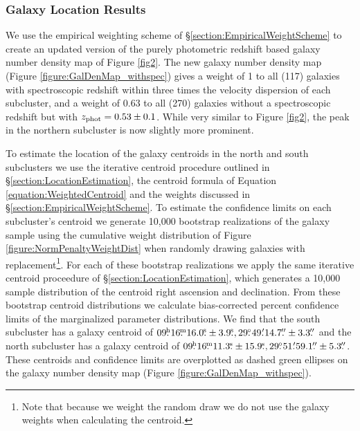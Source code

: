 \subsubsection{Galaxy Location Results}

We use the empirical weighting scheme of \S\ref{section:EmpiricalWeightScheme} to create an updated version of the purely photometric redshift based galaxy number density map of Figure \ref{fig2}.
The new galaxy number density map (Figure \ref{figure:GalDenMap_withspec}) gives a weight of 1 to all (117) galaxies with spectroscopic redshift within three times the velocity dispersion of each subcluster, and a  weight of 0.63 to all (270) galaxies without a spectroscopic redshift but with $z_{\rm phot}=0.53\pm0.1$.
While very similar to Figure \ref{fig2}, the peak in the northern subcluster is now slightly more prominent.

To estimate the location of the galaxy centroids in the north and south subclusters we use the iterative centroid procedure outlined in \S\ref{section:LocationEstimation}, the centroid formula of Equation \ref{equation:WeightedCentroid} and the weights discussed in \S\ref{section:EmpiricalWeightScheme}.
To estimate the confidence limits on each subcluster's centroid we generate 10,000 bootstrap realizations of the galaxy sample using the cumulative weight distribution of Figure \ref{figure:NormPenaltyWeightDist} when randomly drawing galaxies with replacement\footnote{Note that because we weight the random draw we do not use the galaxy weights when calculating the centroid.}.
For each of these bootstrap realizations we apply the same iterative centroid proceedure of \S\ref{section:LocationEstimation}, which generates a 10,000 sample distribution of the centroid right ascension and declination.
From these bootstrap centroid distributions we calculate bias-corrected percent confidence limits \citep{Beers:1990kg} of the marginalized parameter distributions.
We find that the south subcluster has a galaxy centroid of $09\fh16\fm16.0\fs\pm3.9\fs, 29\fdg49\farcm14.7\farcs\pm3.3\farcs$ and the north subcluster has a galaxy centroid of $09\fh16\fm11.3\fs\pm15.9\fs, 29\fdg51\farcm59.1\farcs\pm5.3\farcs$.
These centroids and confidence limits are overplotted as dashed green ellipses on the galaxy number density map (Figure \ref{figure:GalDenMap_withspec}). 

